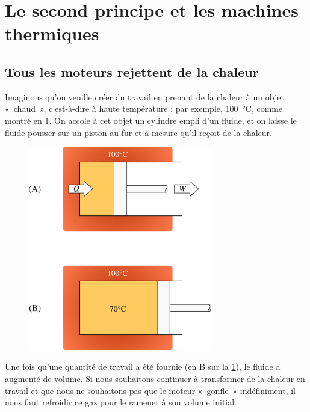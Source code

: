 \section{Le second principe et les machines thermiques}
\label{ch_second_principe_machines_thermiques}

	\subsection{Tous les moteurs rejettent de la chaleur}
	\label{ch_demo_second_principe}

		Imaginons qu’on veuille créer du travail en prenant de la chaleur à un objet «~chaud~», c’est-à-dire à haute température : par exemple, \SI{100}{\degreeCelsius}, comme montré en \cref{fig_démo_second_principe_1}. On accole à cet objet un cylindre empli d’un fluide, et on laisse le fluide pousser sur un piston au fur et à mesure qu’il reçoit de la chaleur.

		\begin{figure}
			\begin{center}
				\includegraphics[width=8cm]{images/demo_second_principe_1.png}
			\end{center}
			\label{fig_démo_second_principe_1}
		\end{figure}

		Une fois qu’une quantité de travail a été fournie (en B sur la \cref{fig_démo_second_principe_1}), le fluide a augmenté de volume. Si nous souhaitons continuer à transformer de la chaleur en travail et que nous ne souhaitons pas que le moteur «~gonfle~» indéfiniment, il nous faut refroidir ce gaz pour le ramener à son volume initial.


